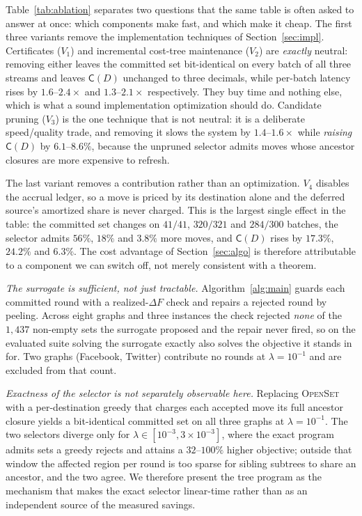 Table~\ref{tab:ablation} separates two questions that the same table is often
asked to answer at once: which components make \DyLo{} fast, and which make it
cheap. The first three variants remove the implementation techniques of
Section~\ref{sec:impl}. Certificates ($V_1$) and incremental cost-tree
maintenance ($V_2$) are \emph{exactly} neutral: removing either leaves the
committed set bit-identical on every batch of all three streams and leaves
$\mathsf C(D)$ unchanged to three decimals, while per-batch latency rises by
$1.6$--$2.4\times$ and $1.3$--$2.1\times$ respectively. They buy time and
nothing else, which is what a sound implementation optimization should do.
Candidate pruning ($V_3$) is the one technique that is not neutral: it is a
deliberate speed/quality trade, and removing it slows the system by
$1.4$--$1.6\times$ while \emph{raising} $\mathsf C(D)$ by $6.1$--$8.6\%$,
because the unpruned selector admits moves whose ancestor closures are more
expensive to refresh.

The last variant removes a contribution rather than an optimization. $V_4$
disables the accrual ledger, so a move is priced by its destination alone and
the deferred source's amortized share is never charged. This is the largest
single effect in the table: the committed set changes on $41/41$, $320/321$ and
$284/300$ batches, the selector admits $56\%$, $18\%$ and $3.8\%$ more moves,
and $\mathsf C(D)$ rises by $17.3\%$, $24.2\%$ and $6.3\%$. The cost advantage
of Section~\ref{sec:algo} is therefore attributable to a component we can switch
off, not merely consistent with a theorem.

\emph{The surrogate is sufficient, not just tractable.} Algorithm~\ref{alg:main}
guards each committed round with a realized-$\Delta F$ check and repairs a
rejected round by peeling. Across eight graphs and three instances the check
rejected \emph{none} of the $1{,}437$ non-empty sets the surrogate proposed and
the repair never fired, so on the evaluated suite solving the surrogate exactly
also solves the objective it stands in for. Two graphs (Facebook, Twitter)
contribute no rounds at $\lambda=10^{-1}$ and are excluded from that count.

\emph{Exactness of the selector is not separately observable here.} Replacing
\textsc{OpenSet} with a per-destination greedy that charges each accepted move
its full ancestor closure yields a bit-identical committed set on all three
graphs at $\lambda=10^{-1}$. The two selectors diverge only for
$\lambda\in[10^{-3},3\times10^{-3}]$, where the exact program admits sets a
greedy rejects and attains a $32$--$100\%$ higher objective; outside that window
the affected region per round is too sparse for sibling subtrees to share an
ancestor, and the two agree. We therefore present the tree program as the
mechanism that makes the exact selector linear-time rather than as an
independent source of the measured savings.

